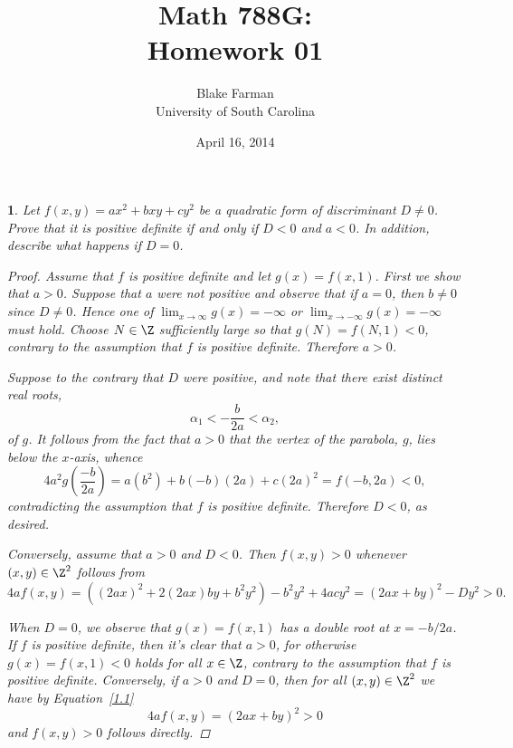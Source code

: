 \documentclass[10pt]{amsart}
\author{Blake Farman\\University of South Carolina}
\title{Math 788G:\\Homework 01}
\date{April 16, 2014}
\begin{document}
\maketitle

\providecommand{\p}{\mathfrak{p}}
\providecommand{\m}{\mathfrak{m}}
\providecommand{\Deck}[1]{\operatorname{Deck}\left(#1\right)}
\newtheorem{thm}{}
\newtheorem{lem}{Lemma}
\newtheorem{prop}{Proposition}
\theoremstyle{definition}
\newtheorem{defn}{Definition}[thm]

\newcommand{\A}{\mathbb{A}}

\begin{thm}\label{Ex1}
  Let $f(x,y) = ax^2 + bxy + cy^2$ be a quadratic form of discriminant $D \neq 0$.
  Prove that it is positive definite if and only if $D < 0$ and $a < 0$.
  In addition, describe what happens if $D = 0$.

  \begin{proof}
    Assume that $f$ is positive definite and let $g(x) = f(x,1)$.
    First we show that $a > 0$.
    Suppose that $a$ were not positive and observe that if $a = 0$, then $b \neq 0$ since $D \neq 0$.
    Hence one of $\lim_{x \rightarrow \infty}g(x) = -\infty$ or $\lim_{x \rightarrow -\infty}g(x) = -\infty$ must hold.
    Choose $N \in \Z$ sufficiently large so that $g(N) = f(N,1) < 0$, contrary to the assumption that $f$ is positive definite.
    Therefore $a > 0$.
    
    Suppose to the contrary that $D$ were positive, and note that there exist distinct real roots, 
    $$\alpha_1 <  -\frac{b}{2a} < \alpha_2,$$
    of $g$.
    It follows from the fact that $a > 0$ that the vertex of the parabola, $g$, lies below the $x$-axis, whence
    $$4a^2g\left(\frac{-b}{2a}\right) = a(b^2) + b(-b)(2a) + c(2a)^2 = f(-b, 2a) < 0,$$
    contradicting the assumption that $f$ is positive definite.
    Therefore $D < 0$, as desired.

    Conversely, assume that $a > 0$ and $D < 0$.		
    Then $f(x,y) > 0$ whenever $(x,y) \in \Z^2$ follows from
    \begin{equation}\label{1.1}
      4af(x,y) = \left((2ax)^2 + 2(2ax)by + b^2y^2\right) - b^2y^2 + 4acy^2 = (2ax + by)^2 - Dy^2 > 0.
    \end{equation}
    
    When $D = 0$, we observe that $g(x) = f(x,1)$ has a double root at $x = -b/2a$.
    If $f$ is positive definite, then it's clear that $a > 0$, for otherwise $g(x) = f(x,1) < 0$ holds for all $x \in \Z$, contrary to the assumption that $f$ is positive definite.
    Conversely, if $a > 0$ and $D = 0$, then for all $(x,y) \in \Z^2$ we have by Equation~\eqref{1.1}
    $$4af(x,y) = (2ax + by)^2 > 0$$
    and $f(x,y) > 0$ follows directly.
  \end{proof}
\end{thm}
\end{document}
